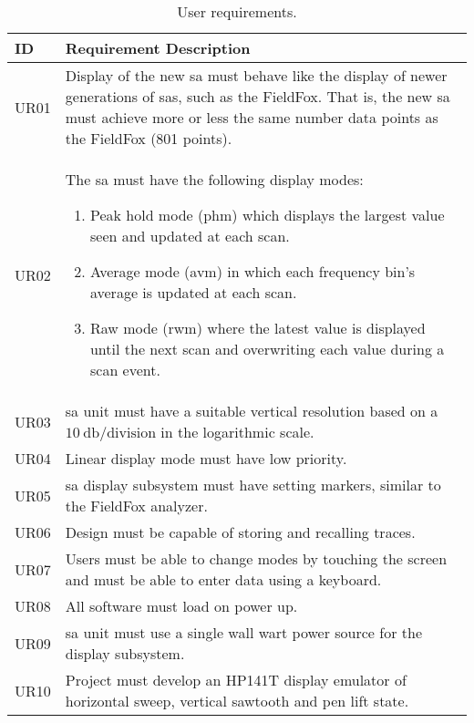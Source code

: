 \documentclass[class=report,11pt,crop=false]{standalone}
\begin{document}
\begin{table}[!ht]
	\centering
	\caption{User requirements.}
	\label{tab:user-requirements}
	\begin{tabular}{|m{5em}|m{40em}|}
		\hline
		\textbf{ID}	& \textbf{Requirement Description}\\
		\hline
		UR01	& Display of the new \acrshort{sa} must behave like the display of newer generations of \acrshort{sa}s, such as the FieldFox. That is, the new \acrshort{sa} must achieve more or less the same number data points as the FieldFox (801 points). \\
		\hline
		UR02	& The \acrshort{sa} must have the following display modes:
		\begin{enumerate}[label=(\alph*)]
			\item 
			Peak hold mode (\acrshort{phm}) which displays the largest value seen and updated at each scan.
			\item 
			Average mode (\acrshort{avm}) in which each frequency bin's average is updated at each scan. 
			\item 
			Raw mode (\acrshort{rwm}) where the latest value is displayed until the next scan and overwriting each value during a scan event.
		\end{enumerate}\\
		\hline
		UR03	& \acrshort{sa} unit must have a suitable vertical resolution based on a $\SI{10}{\decibel}\text{/division}$ in the logarithmic scale.\\
		\hline
		UR04	& Linear display mode must have low priority.\\
		\hline
		UR05	& \acrshort{sa} display subsystem must have setting markers, similar to the FieldFox analyzer.\\
		\hline
		UR06	& Design must be capable of storing and recalling traces.\\
		\hline
		UR07	& Users must be able to change modes by touching the screen and must be able to enter data using a keyboard.\\
		\hline
		UR08	& All software must load on power up.\\
		\hline
		UR09	& \acrshort{sa} unit must use a single wall wart power source for the display subsystem.\\
		\hline
		UR10	& Project must develop an HP141T display emulator of horizontal sweep, vertical sawtooth and pen lift state.\\
		\hline
	\end{tabular}
\end{table}
\end{document}
